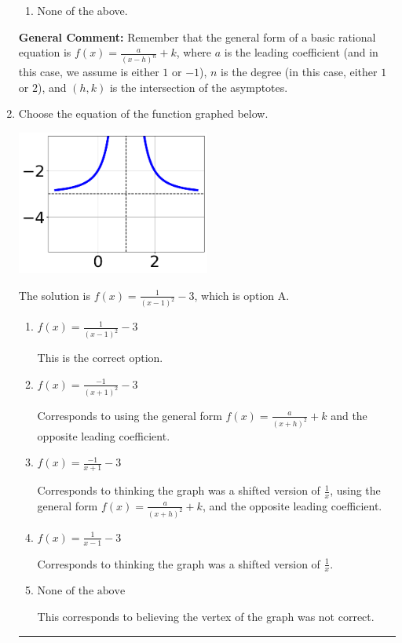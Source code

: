 \documentclass{extbook}[14pt]
\newcommand{\litem}[1]{\item #1

\rule{\textwidth}{0.4pt}}
\begin{document}
\begin{enumerate}
{\begin{enumerate}[label=\Alph*.]
\begin{multicols}{2}
\end{multicols}\item None of the above.\end{enumerate}
\textbf{General Comment:} Remember that the general form of a basic rational equation is $ f(x) = \frac{a}{(x-h)^n} + k$, where $a$ is the leading coefficient (and in this case, we assume is either $1$ or $-1$), $n$ is the degree (in this case, either $1$ or $2$), and $(h, k)$ is the intersection of the asymptotes.
}
\litem{
Choose the equation of the function graphed below.

\begin{center}
    \includegraphics[width=0.5\textwidth]{../Figures/rationalGraphToEquationB.png}
\end{center}




The solution is \( f(x) = \frac{1}{(x - 1)^2} - 3 \), which is option A.\begin{enumerate}[label=\Alph*.]
\item \( f(x) = \frac{1}{(x - 1)^2} - 3 \)

This is the correct option.
\item \( f(x) = \frac{-1}{(x + 1)^2} - 3 \)

Corresponds to using the general form $f(x) = \frac{a}{(x+h)^2}+k$ and the opposite leading coefficient.
\item \( f(x) = \frac{-1}{x + 1} - 3 \)

Corresponds to thinking the graph was a shifted version of $\frac{1}{x}$, using the general form $f(x) = \frac{a}{(x+h)^2}+k$, and the opposite leading coefficient.
\item \( f(x) = \frac{1}{x - 1} - 3 \)

Corresponds to thinking the graph was a shifted version of $\frac{1}{x}$.
\item \( \text{None of the above} \)

This corresponds to believing the vertex of the graph was not correct.
\end{enumerate}

}
\end{enumerate}
\end{document}
